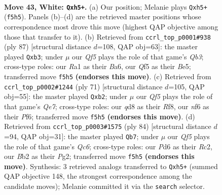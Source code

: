 \documentclass[11pt]{article}
\begin{document}
\clearpage

\begin{figure}[p]\centering
\begin{subfigure}{0.46\textwidth}\centering
\resizebox{\linewidth}{!}{%
\newchessgame
\chessboard[
  setfen={3q3k/1b1n1p2/3P1n2/2p2Q1p/p6P/5pP1/PB6/R5K1 w - - 6 43},
  showmover=false,
  pgfstyle=straightmove, color=movearrow, markmove={f5-h5}
]}
\caption{}
\end{subfigure}\hfill
\begin{subfigure}{0.46\textwidth}\centering
\resizebox{\linewidth}{!}{%
\newchessgame
\chessboard[
  setfen={6k1/5p2/bq1N2pp/3Pb3/4N1r1/1Q4P1/5P2/1R4K1 b - - 2 44},
  showmover=false,
  pgfstyle=straightmove, color=movearrow, markmove={b6-b3}
]}
\caption{}
\end{subfigure}
\\[4pt]
\begin{subfigure}{0.46\textwidth}\centering
\resizebox{\linewidth}{!}{%
\newchessgame
\chessboard[
  setfen={5r1k/7p/p3Pp2/5Q2/P1p5/5NPP/1P2qP2/6K1 b - - 5 36},
  showmover=false,
  pgfstyle=straightmove, color=movearrow, markmove={e2-b2}
]}
\caption{}
\end{subfigure}\hfill
\begin{subfigure}{0.46\textwidth}\centering
\resizebox{\linewidth}{!}{%
\newchessgame
\chessboard[
  setfen={8/q3bpk1/P1Q2np1/4p3/1PB1n2p/8/2R3PP/1K6 w - - 0 43},
  showmover=false,
  pgfstyle=straightmove, color=movearrow, markmove={c6-b7}
]}
\caption{}
\end{subfigure}
\caption{\textbf{Move 43, White: \texttt{Qxh5+}.} (a) Our position; Melanie plays \texttt{Qxh5+} (\texttt{f5h5}). Panels (b)--(d) are the retrieved master positions whose correspondence most drove this move (highest QAP objective among those that transfer to it). (b) Retrieved from \texttt{ccrl\_top\_p0001\#938} (ply 87) [structural distance $d$=108, QAP obj=63]: the master played \texttt{Qxb3}; under $\mu$ our \emph{Qf5} plays the role of that game's \emph{Qb3}; cross-type roles: our \emph{R}a1 as their \emph{B}a6, our \emph{Q}f5 as their \emph{B}e5; transferred move \texttt{f5h5} \textbf{(endorses this move)}. (c) Retrieved from \texttt{ccrl\_top\_p0002\#1244} (ply 71) [structural distance $d$=105, QAP obj=55]: the master played \texttt{Qxb2}; under $\mu$ our \emph{Qf5} plays the role of that game's \emph{Qe7}; cross-type roles: our \emph{q}d8 as their \emph{R}f8, our \emph{n}f6 as their \emph{P}f6; transferred move \texttt{f5h5} \textbf{(endorses this move)}. (d) Retrieved from \texttt{ccrl\_top\_p0003\#1575} (ply 84) [structural distance $d$=94, QAP obj=31]: the master played \texttt{Qb7}; under $\mu$ our \emph{Qf5} plays the role of that game's \emph{Qc6}; cross-type roles: our \emph{P}d6 as their \emph{R}c2, our \emph{B}b2 as their \emph{P}g2; transferred move \texttt{f5h5} \textbf{(endorses this move)}. Synthesis: 3 retrieved analogs transferred to \texttt{Qxh5+} (summed QAP objective 148, the strongest correspondence among the candidate moves); Melanie committed it via the \texttt{search} selector.}
\label{fig:thought-m84}
\end{figure}
\end{document}
